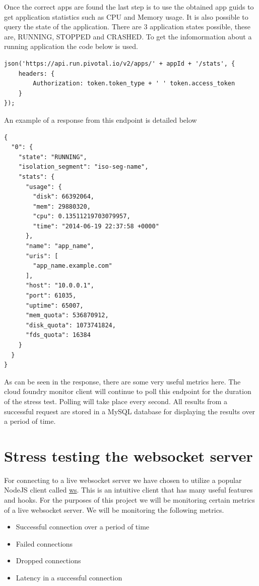 Once the correct apps are found the last step is to use the obtained app guids to get application statistics such as CPU and Memory usage. It is also possible to query the state of the application. There are 3 application states possible, these are, RUNNING, STOPPED and CRASHED. To get the infomormation about a running application the code below is used. 

\begin{verbatim}
json('https://api.run.pivotal.io/v2/apps/' + appId + '/stats', {
    headers: {
        Authorization: token.token_type + ' ' token.access_token
    }
});
\end{verbatim}

An example of a response from this endpoint is detailed below

\begin{verbatim}
{
  "0": {
    "state": "RUNNING",
    "isolation_segment": "iso-seg-name",
    "stats": {
      "usage": {
        "disk": 66392064,
        "mem": 29880320,
        "cpu": 0.13511219703079957,
        "time": "2014-06-19 22:37:58 +0000"
      },
      "name": "app_name",
      "uris": [
        "app_name.example.com"
      ],
      "host": "10.0.0.1",
      "port": 61035,
      "uptime": 65007,
      "mem_quota": 536870912,
      "disk_quota": 1073741824,
      "fds_quota": 16384
    }
  }
}
\end{verbatim}

As can be seen in the response, there are some very useful metrics here. The cloud foundry monitor client will continue to poll this endpoint for the duration of the stress test. Polling will take place every second. All results from a successful request are stored in a MySQL database for displaying the results over a period of time.

\section{Stress testing the websocket server}

For connecting to a live websocket server we have chosen to utilize a popular NodeJS client called \href{https://www.npmjs.com/package/ws}{ws}. This is an intuitive client that has many useful features and hooks. For the purposes of this project we will be monitoring certain metrics of a live websocket server. We will be monitoring the following metrics.

\begin{itemize}
  \item Successful connection over a period of time
  \item Failed connections
  \item Dropped connections
  \item Latency in a successful connection
\end{itemize}


